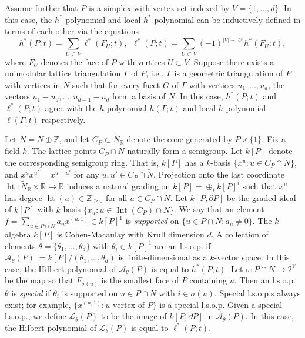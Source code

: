 \documentclass[11pt]{article}
\theoremstyle{definition}
\numberwithin{equation}{section}
\def\R{\mathbb{R}}
\def\Z{\mathbb{Z}}
\DeclareMathOperator{\Int}{Int}
\DeclareMathOperator{\hht}{ht}
\numberwithin{equation}{section}
\begin{document}
Assume further that $P$ is a simplex with vertex set indexed by $V = \{ 1, \ldots, d\}$. In this case, the $h^*$-polynomial and local $h^*$-polynomial can be inductively defined in terms of each other via the equations
\[
h^*(P;t) = \sum_{U \subset V} \ell^*(F_U;t),\: \: \ell^*(P;t) = \sum_{U \subset V}  (-1)^{|V| - |U|} h^*(F_U;t),
\]
where $F_U$ denotes the face of $P$ with vertices $U \subset V$.  
Suppose 
there exists a unimodular lattice triangulation $\Gamma$ of $P$, i.e., $\Gamma$ is a geometric triangulation of $P$ with vertices in $N$ such that for every facet $G$ of $\Gamma$ with vertices $u_1,\ldots,u_{d}$, the vectors $u_1 - u_{d}, \ldots,u_{d - 1} - u_{d}$ form a basis of $N$.  In this case, $h^*(P;t)$ and $\ell^*(P;t)$ agree with the $h$-polynomial $h(\Gamma;t)$ and local $h$-polynomial $\ell(\Gamma;t)$ respectively. 


Let $\tilde{N} = N \oplus \Z$, and let 
$C_P \subset \tilde{N}_\R$ denote the cone generated by $P \times \{1\}$. 
Fix a field $k$. The lattice points $C_P \cap \tilde{N}$ naturally form a semigroup. Let $k[P]$ denote the corresponding semigroup ring. That is, $k[P]$ has a $k$-basis $\{ x^u : u \in C_P \cap \tilde{N}\}$, and $x^{u} x^{u'} = x^{u + u'}$ for any $u,u' \in C_P \cap \tilde{N}$. Projection onto the last coordinate $\hht \colon \tilde{N}_\R \times \R \to \R$  induces a natural grading on $k[P] = \oplus_i k[P]^i$ such that $x^u$ has degree  $\hht(u) \in \Z_{\ge 0}$ for all $u \in C_P \cap \tilde{N}$. 
Let $k[P, \partial P]$ be the graded ideal of $k[P]$ with $k$-basis $\{ x_u : u \in \Int(C_P) \cap \tilde{N}\}$. 
We say that an element $f = \sum_{u \in P \cap N} a_u x^{(u,1)} \in k[P]^1$ is \emph{supported} on $\{ u \in P \cap N : a_u \neq 0 \}$. 
The $k$-algebra $k[P]$ is Cohen-Macaulay with Krull dimension $d$. A collection of 
elements $ \theta = \{ \theta_1,\ldots,\theta_d \}$ with $\theta_i \in k[P]^1$ are an l.s.o.p. if $\mathscr{A}_\theta(P) := k[P]/(\theta_1, \dotsc, \theta_d)$ is finite-dimensional as a $k$-vector space. In this case, the Hilbert polynomial of $\mathscr{A}_\theta(P)$ is equal to $h^*(P;t)$. 
Let
$\sigma \colon  P \cap N \to  2^V$
be the map so that $F_{\sigma(u)}$ is the smallest face of $P$ containing $u$. Then an l.s.o.p. $\theta$ is \emph{special} if  $\theta_i$ is supported on $u \in P \cap N$ with $i \in \sigma(u)$. Special l.s.o.p.s always exist; for example, $\{ x^{(u,1)} : u \textrm{ vertex of } P \}$ is a special l.s.o.p. Given a special l.s.o.p., we define  $\mathscr{L}_{\theta}(P)$ to be the image of $k[P, \partial P]$ in $\mathscr{A}_\theta(P)$. In this case, the Hilbert polynomial of $\mathscr{L}_\theta(P)$ is equal to $\ell^*(P;t)$.  
\end{document}
